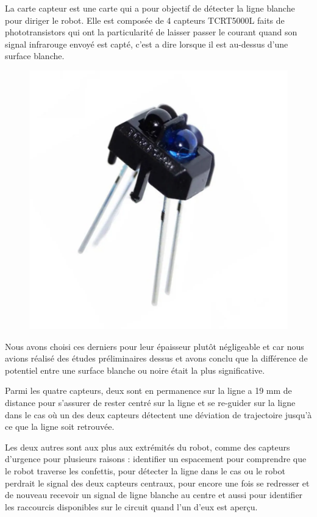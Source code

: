 La carte capteur est une carte qui a pour objectif de détecter la ligne blanche pour diriger le robot.
Elle est composée de 4 capteurs TCRT5000L faits de phototransistors qui ont la particularité de laisser passer le courant quand son signal infrarouge envoyé est capté, c’est a dire lorsque il est au-dessus d’une surface blanche.

\begin{figure}[H]
\centering
\begin{minipage}{.5\textwidth}
  \centering
  \centerline{\includegraphics[width=0.6\linewidth]{img/composants/tcrt5000.png}}
  \label{fig:tcrt5000}
\end{minipage}%
\end{figure}
Nous avons choisi ces derniers pour leur épaisseur plutôt négligeable et car nous avions réalisé des études préliminaires dessus et avons conclu que la différence de potentiel entre une surface blanche ou noire était la plus significative.

Parmi les quatre capteurs, deux sont en permanence sur la ligne a 19 mm de distance pour s'assurer de rester centré sur la ligne et se re-guider sur la ligne dans le cas où un des deux capteurs détectent une déviation de trajectoire jusqu'à ce que la ligne soit retrouvée.


Les deux autres sont aux plus aux extrémités du robot, comme des capteurs d’urgence pour plusieurs raisons : identifier un espacement pour comprendre que le robot traverse les confettis, pour détecter la ligne dans le cas ou le robot perdrait le signal des deux capteurs centraux, pour encore une fois se redresser et de nouveau recevoir un signal de ligne blanche au centre et aussi pour identifier les raccourcis disponibles sur le circuit quand l’un d’eux est aperçu.


